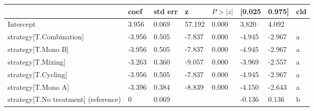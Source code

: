 \begin{tabular}{llllllll}
\toprule
 & coef & std err & z & $P>|z|$ & [0.025 & 0.975] & cld \\
\midrule
Intercept & 3.956 & 0.069 &    57.192 &  0.000 & 3.820 & 4.092 &  \\
strategy[T.Combination] & -3.956 & 0.505 &    -7.837 &  0.000 & -4.945 & -2.967 & a \\
strategy[T.Mono B] & -3.956 & 0.505 &    -7.837 &  0.000 & -4.945 & -2.967 & a \\
strategy[T.Mixing] & -3.263 & 0.360 &    -9.057 &  0.000 & -3.969 & -2.557 & a \\
strategy[T.Cycling] & -3.956 & 0.505 &    -7.837 &  0.000 & -4.945 & -2.967 & a \\
strategy[T.Mono A] & -3.396 & 0.384 &    -8.839 &  0.000 & -4.150 & -2.643 & a \\
strategy[T.No treatment] (reference) & 0 & 0.069 &  &  & -0.136 & 0.136 & b \\
\bottomrule
\end{tabular}
